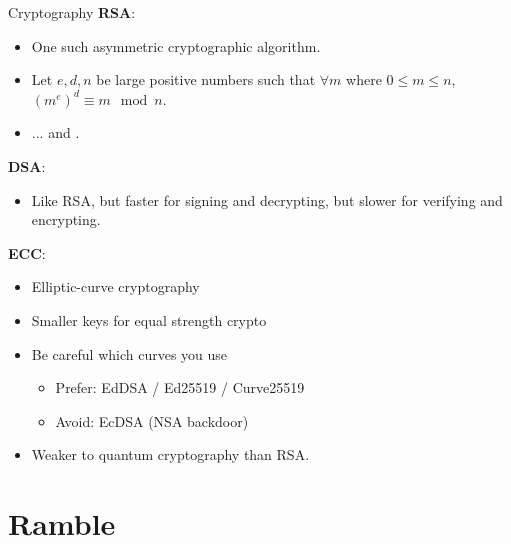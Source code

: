 \documentclass{beamer}
\newcommand{\bhref}[2]{\href{#1}{\color{blue}{\underline{#2}}}}
\begin{document}
\begin{frame}{Cryptography}
	\textbf{RSA}:
	\begin{itemize}
		\item One such asymmetric cryptographic algorithm.

		\item Let $e, d, n$ be large positive numbers such that $\forall
		m$ where $0 \leqslant m \leqslant n$, $(m^e)^d \equiv m \mod n$.

		\item ... and
		\bhref{https://people.csail.mit.edu/rivest/Rsapaper.pdf}{lots}
		\bhref{https://patentimages.storage.googleapis.com/49/43/9c/b155bf231090f6/US4405829.pdf}{more}
		\bhref{https://github.com/libressl-portable/openbsd/tree/master/src/lib/libcrypto/rsa}{math}.
	\end{itemize}

	\textbf{DSA}:
	\begin{itemize}
		\item Like RSA, but faster for signing and decrypting, but
		slower for verifying and encrypting.
	\end{itemize}

	\textbf{ECC}:
	\begin{itemize}
		\item Elliptic-curve cryptography

		\item Smaller keys for equal strength crypto

		\item Be careful which curves you use
		\begin{itemize}
			\item {\color{darkgreen}Prefer: EdDSA / Ed25519 /
			Curve25519}

			\item {\color{red}Avoid: EcDSA (NSA backdoor)}
		\end{itemize}

		\item Weaker to quantum cryptography than RSA.
	\end{itemize}
\end{frame}

\section{Ramble}
\end{document}
